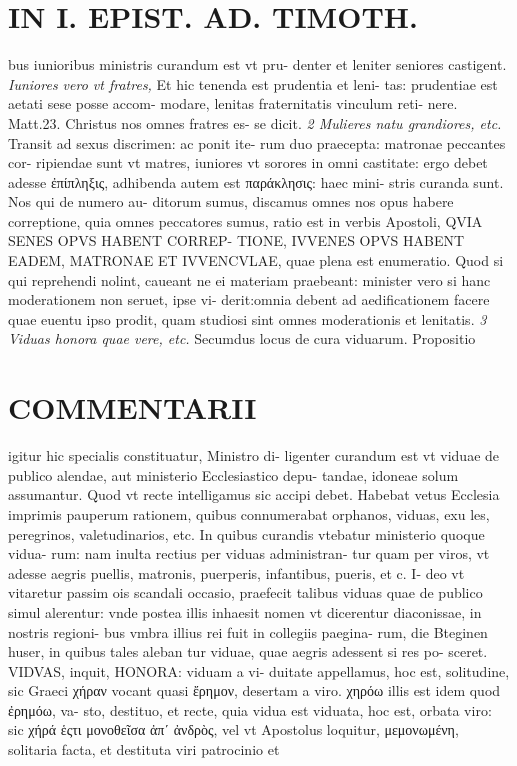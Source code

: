 \documentclass{article}
\begin{document}
\begin{pages}
\section*{IN I. EPIST. AD. TIMOTH. }
\marginpar{[ p.119 ]}\pstart bus iunioribus ministris curandum est vt pru- denter et leniter seniores castigent.  \pend
\textit{Iuniores vero vt fratres, }\pstart Et hic tenenda est prudentia et leni- tas: prudentiae est aetati sese posse accom- modare, lenitas fraternitatis vinculum reti- nere. Matt.23. Christus nos omnes fratres es- se dicit.  \pend
\textit{2 Mulieres natu grandiores, etc. }\pstart Transit ad sexus discrimen: ac ponit ite- rum duo praecepta: matronae peccantes cor- ripiendae sunt vt matres, iuniores vt sorores in omni castitate: ergo debet adesse ἐπίπληξις, adhibenda autem est παράκλησις: haec mini- stris curanda sunt. Nos qui de numero au- ditorum sumus, discamus omnes nos opus habere correptione, quia omnes peccatores sumus, ratio est in verbis Apostoli, QVIA SENES OPVS HABENT CORREP- TIONE, IVVENES OPVS HABENT EADEM, MATRONAE ET IVVENCVLAE, quae plena est enumeratio. Quod si qui reprehendi nolint, caueant ne ei materiam praebeant: minister vero si hanc moderationem non seruet, ipse vi- derit:omnia debent ad aedificationem facere quae euentu ipso prodit, quam studiosi sint omnes moderationis et lenitatis.  \pend
\textit{3 Viduas honora quae vere, etc. }\pstart Secumdus locus de cura viduarum. Propositio  \pend
\section*{COMMENTARII }
\marginpar{[ p.120 ]}\pstart igitur hic specialis constituatur, Ministro di- ligenter curandum est vt viduae de publico alendae, aut ministerio Ecclesiastico depu- tandae, idoneae solum assumantur. Quod vt recte intelligamus sic accipi debet. Habebat vetus Ecclesia imprimis pauperum rationem, quibus connumerabat orphanos, viduas, exu les, peregrinos, valetudinarios, etc. In quibus curandis vtebatur ministerio quoque vidua- rum: nam inulta rectius per viduas administran- tur quam per viros, vt adesse aegris puellis, matronis, puerperis, infantibus, pueris, et c. I- deo vt vitaretur passim ois scandali occasio, praefecit talibus viduas quae de publico simul alerentur: vnde postea illis inhaesit nomen vt dicerentur diaconissae, in nostris regioni- bus vmbra illius rei fuit in collegiis paegina- rum, die Bteginen huser, in quibus tales aleban tur viduae, quae aegris adessent si res po- sceret.  \pend\pstart VIDVAS, inquit, HONORA: viduam a vi- duitate appellamus, hoc est, solitudine, sic Graeci χήραν vocant quasi ἔρημον, desertam a viro. χηρόω illis est idem quod ἐρημόω, va- sto, destituo, et recte, quia vidua est viduata, hoc est, orbata viro: sic χήρά ἑςτι  μονοθεῖσα ἀπʹ ἀνδρὸς, vel vt Apostolus loquitur, μεμονωμένη, solitaria facta, et destituta viri patrocinio et  \pend

\end{pages}
\end{document}
